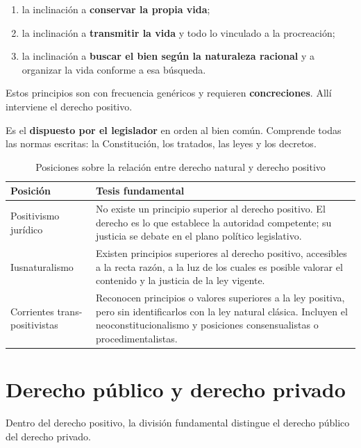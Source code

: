 \documentclass[12pt,oneside]{book}
\begin{document}
\begin{enumerate}
\item la inclinación a \textbf{conservar la propia vida};
\item la inclinación a \textbf{transmitir la vida} y todo lo vinculado a la procreación;
\item la inclinación a \textbf{buscar el bien según la naturaleza racional} y a organizar la vida conforme a esa búsqueda.
\end{enumerate}

Estos principios son con frecuencia genéricos y requieren \textbf{concreciones}. Allí interviene el derecho positivo.

\begin{definicion}
Es el \textbf{dispuesto por el legislador} en orden al bien común. Comprende todas las normas escritas: la Constitución, los tratados, las leyes y los decretos.
\end{definicion}

\begin{table}[H]
\centering
\begin{tabularx}{\textwidth}{B{0.27\textwidth} Y}
\toprule
\textbf{Posición} & \textbf{Tesis fundamental} \\
\midrule
Positivismo jurídico & No existe un principio superior al derecho positivo. El derecho es lo que establece la autoridad competente; su justicia se debate en el plano político legislativo. \\
Iusnaturalismo & Existen principios superiores al derecho positivo, accesibles a la recta razón, a la luz de los cuales es posible valorar el contenido y la justicia de la ley vigente. \\
Corrientes trans-positivistas & Reconocen principios o valores superiores a la ley positiva, pero sin identificarlos con la ley natural clásica. Incluyen el neoconstitucionalismo y posiciones consensualistas o procedimentalistas. \\
\bottomrule
\end{tabularx}
\caption{Posiciones sobre la relación entre derecho natural y derecho positivo}
\end{table}

\section{Derecho público y derecho privado}

Dentro del derecho positivo, la división fundamental distingue el derecho público del derecho privado.
\end{document}
